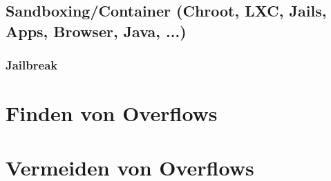 \documentclass[12pt]{book}
\begin{document}
\section{Sandboxing/Container (Chroot, LXC, Jails, Apps, Browser, Java, ...)}

\subsection{Jailbreak}

\chapter{Finden von Overflows}

\chapter{Vermeiden von Overflows}
\end{document}

